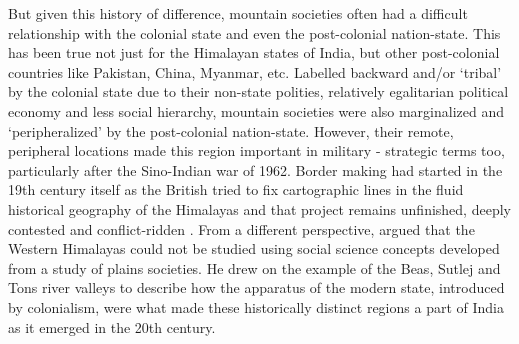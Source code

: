 But given this history of difference, mountain societies often had a difficult relationship with the colonial state and even the post-colonial nation-state. This has been true not just for the Himalayan states of India, but other post-colonial countries like Pakistan, China, Myanmar, etc. Labelled backward and/or ‘tribal’ by the colonial state due to their non-state polities, relatively egalitarian political economy and less social hierarchy, mountain societies were also marginalized and ‘peripheralized’ by the post-colonial nation-state. However, their remote, peripheral locations made this region important in military - strategic terms too, particularly after the Sino-Indian war of 1962. Border making had started in the 19th century itself as the British tried to fix cartographic lines in the fluid historical geography of the Himalayas and that project remains unfinished, deeply contested and conflict-ridden \citep{noorani2010india,guyot2017shadow,acharya2022boundaries}. From a different perspective, \cite{alam2008becoming} argued that the Western Himalayas could not be studied using social science concepts developed from a study of plains societies. He drew on the example of the Beas, Sutlej and Tons river valleys to describe how the apparatus of the modern state, introduced by colonialism, were what made these historically distinct regions a part of India as it emerged in the 20th century.

